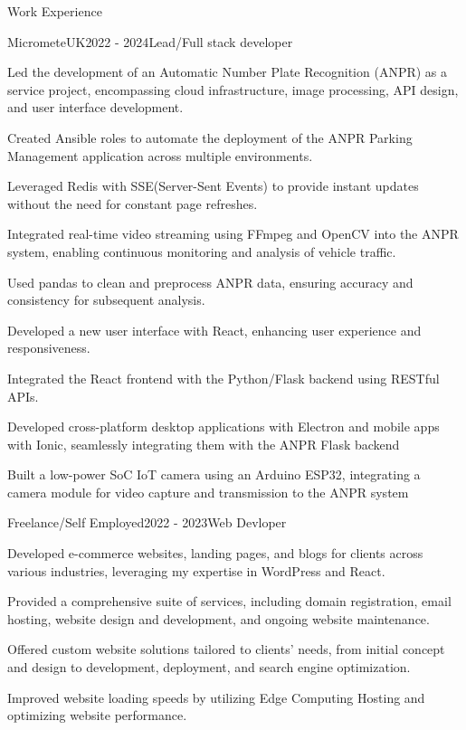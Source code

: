 \documentclass{resume}
\begin{document}
\begin{rSection}{Work Experience}
\begin{rSubsection}{MicrometeUK}{2022 -  2024}{Lead/Full stack developer}

\item Led the development of an Automatic Number Plate Recognition (ANPR) as a service project, encompassing  cloud infrastructure, image processing, API design, and  user interface development.
\item Created Ansible roles to automate the deployment of the ANPR Parking Management application across multiple environments.
\item Leveraged Redis  with SSE(Server-Sent Events) to provide instant updates without  the need for constant page refreshes.
\item Integrated real-time video streaming using FFmpeg and OpenCV into the ANPR system, enabling continuous monitoring and analysis of vehicle traffic.
\item Used pandas to clean and preprocess ANPR data, ensuring accuracy and consistency for subsequent analysis.
\item Developed a new user interface with React, enhancing user experience and responsiveness.
\item Integrated the React frontend with the Python/Flask backend using RESTful APIs.
\item Developed cross-platform desktop applications with Electron and mobile apps with Ionic, seamlessly integrating them with the ANPR Flask backend
\item Built a low-power SoC IoT camera using an  Arduino ESP32, integrating a camera module for video capture and transmission to the ANPR system
\end{rSubsection}
\begin{rSubsection}{Freelance/Self Employed}{2022 - 2023}{Web Devloper }{}
\item Developed e-commerce websites, landing pages, and blogs for clients across various industries, leveraging my expertise in  WordPress and React.
\item Provided a comprehensive suite of services, including domain registration, email hosting, website design and development, and ongoing website maintenance.
\item Offered custom website solutions tailored to clients' needs, from initial concept and design to development, deployment, and search engine optimization.
\item Improved website loading speeds  by utilizing Edge Computing Hosting and optimizing website performance.

\end{rSubsection}
\end{rSection}
\end{document}
